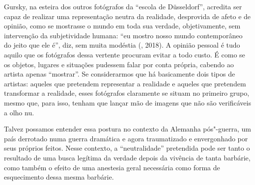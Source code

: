 Gursky, na esteira dos outros fotógrafos da ``escola de Düsseldorf'',
acredita ser capaz de realizar uma representação neutra da realidade,
desprovida de afeto e de opinião, como se mostrasse o mundo em toda sua
verdade, objetivamente, sem intervenção da subjetividade humana: ``eu
mostro nosso mundo contemporâneo do jeito que ele é'', diz, sem muita
modéstia (, 2018). A opinião pessoal é tudo aquilo que os
fotógrafos dessa vertente procuram evitar a todo custo. É como se os
objetos, lugares e situações pudessem falar por conta própria, cabendo
ao artista apenas ``mostrar''. Se considerarmos que há basicamente dois tipos de artistas: aqueles que pretendem representar a realidade e aqueles que pretendem transformar a realidade, esses fotógrafos claramente se situam no primeiro grupo, mesmo que, para isso, tenham que lançar mão de imagens que não são verificáveis a olho nu.

Talvez possamos entender essa postura no contexto da Alemanha
pós"-guerra, um país derrotado numa guerra dramática e agora traumatizado
e envergonhado por seus próprios feitos. Nesse contexto, a
``neutralidade'' pretendida pode ser tanto o resultado de uma busca
legítima da verdade depois da vivência de tanta barbárie, como também o
efeito de uma anestesia geral necessária como forma de esquecimento
dessa mesma barbárie.

